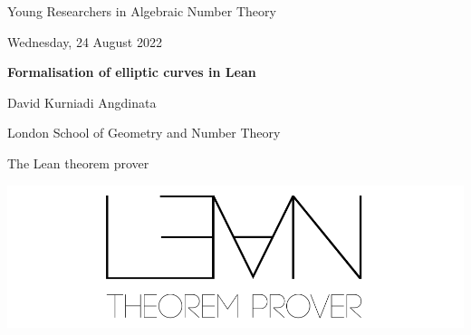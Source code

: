 \documentclass[10pt]{beamer}
\begin{document}
\begin{frame}

\begin{center}

{\small Young Researchers in Algebraic Number Theory}

\vspace{0.5cm}

{\footnotesize Wednesday, 24 August 2022}

\vspace{1cm}

\textbf{\large Formalisation of elliptic curves in Lean}

\vspace{1cm}

David Kurniadi Angdinata

\vspace{0.5cm}

{\scriptsize London School of Geometry and Number Theory}

\end{center}

\end{frame}

\begin{frame}[c]{The Lean theorem prover}

\begin{center}
\includegraphics[width=\textwidth]{LEAN.png}
\end{center}



\end{frame}
\end{document}
